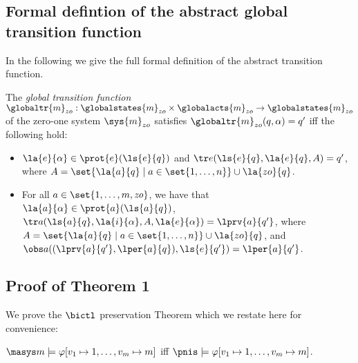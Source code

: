 \subsection*{Formal defintion of the abstract global transition function} In the
following we give the full formal definition of the abstract transition function.
\begin{definition}
  \label{def:globaltransition}
  The {\em global transition function} $\globaltr{m}_{zo} : \globalstates{m}_{zo}
  \times \globalacts{m}_{zo} \rightarrow \globalstates{m}_{zo}$ of the zero-one
  system $\sys{m}_{zo}$ satisfies $\globaltr{m}_{zo}(q, \alpha) = q'$ iff the
  following hold:
  \begin{itemize}
    \item $\la{e}{\alpha} \in \prot{e}({\ls{e}{q}})$ and $\tr e(\ls{e}{q},
    \la{e}{q}, A) = q'$, where
    $A = \set{\la{a}{q} \mid a \in \set{1,\ldots,n}} \cup
\la{zo}{q}$.
    \item For all $a \in \set{1,\ldots,m, \it{zo}}$, we have that
    $\la{a}{\alpha} \in \prot{a}(\ls{a}{q})$, $\tr a (\ls{a}{q}, \la{i}{\alpha},
    A, \la{e}{\alpha}) = \lprv{a}{q'}$, where  $A = \set{\la{a}{q} \mid a \in
    \set{1,\ldots,n}} \cup \la{zo}{q}$, and $\obs
    a((\lprv{a}{q'},\lper{a}{q}),\ls{e}{q'}) = \lper{a}{q'}$.
  \end{itemize}
\end{definition}


\subsection*{Proof of Theorem 1}
We prove the $\bictl$ preservation Theorem which we restate here for
convenience:
\begin{customthm}{1}
$\masys m \models \varphi[v_1 \mapsto 1, \ldots, v_m \mapsto m]$ iff 
$\pnis \models  \varphi[v_1 \mapsto 1, \ldots, v_m \mapsto m]$.
\end{customthm}

